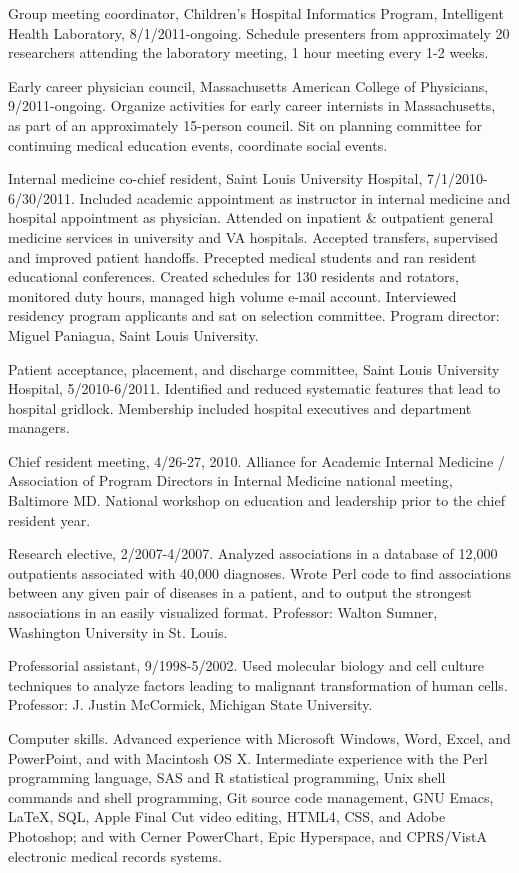 \documentclass[12pt]{article}
\begin{document}
Group meeting coordinator, Children’s Hospital Informatics Program,
Intelligent Health Laboratory, 8/1/2011-ongoing. Schedule presenters
from approximately 20 researchers attending the laboratory meeting, 1
hour meeting every 1-2 weeks.

Early career physician council, Massachusetts American College of
Physicians, 9/2011-ongoing. Organize activities for early career
internists in Massachusetts, as part of an approximately 15-person
council. Sit on planning committee for continuing medical education
events, coordinate social events.

Internal medicine co-chief resident, Saint Louis University Hospital,
7/1/2010-6/30/2011. Included academic appointment as instructor in
internal medicine and hospital appointment as physician. Attended on
inpatient \& outpatient general medicine services in university and VA
hospitals. Accepted transfers, supervised and improved patient
handoffs. Precepted medical students and ran resident educational
conferences. Created schedules for 130 residents and rotators,
monitored duty hours, managed high volume e-mail account. Interviewed
residency program applicants and sat on selection committee. Program
director: Miguel Paniagua, Saint Louis University.

Patient acceptance, placement, and discharge committee, Saint Louis
University Hospital, 5/2010-6/2011. Identified and reduced systematic
features that lead to hospital gridlock. Membership included hospital
executives and department managers.

Chief resident meeting, 4/26-27, 2010. Alliance for Academic Internal
Medicine / Association of Program Directors in Internal Medicine
national meeting, Baltimore MD. National workshop on education and
leadership prior to the chief resident year.

Research elective, 2/2007-4/2007. Analyzed associations in a database
of 12,000 outpatients associated with 40,000 diagnoses. Wrote Perl
code to find associations between any given pair of diseases in a
patient, and to output the strongest associations in an easily
visualized format. Professor: Walton Sumner, Washington University in
St. Louis.

Professorial assistant, 9/1998-5/2002. Used molecular biology and cell
culture techniques to analyze factors leading to malignant
transformation of human cells. Professor: J. Justin McCormick,
Michigan State University.

Computer skills. Advanced experience with Microsoft Windows, Word,
Excel, and PowerPoint, and with Macintosh OS X. Intermediate
experience with the Perl programming language, SAS and R statistical
programming, Unix shell commands and shell programming, Git source
code management, GNU Emacs, \LaTeX, SQL, Apple Final Cut video editing,
HTML4, CSS, and Adobe Photoshop; and with Cerner PowerChart, Epic
Hyperspace, and CPRS/VistA electronic medical records systems.
\end{document}
